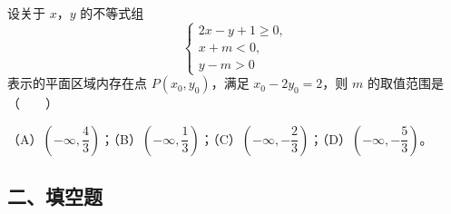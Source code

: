 \begin{question}
设关于 $x$，$y$ 的不等式组
\nopagebreak[4]
\[\begin{cases}2x-y+1\geqslant0,\\ x+m<0,\\ y-m>0\end{cases}\]
表示的平面区域内存在点 $P(x_0,y_0)$，满足 $x_0-2y_0=2$，则 $m$ 的取值范围是\mbox{（　　）}

（A）$\left(-\infty,\dfrac43\right)$；（B）$\left(-\infty,\dfrac13\right)$；（C）$\left(-\infty,-\dfrac23\right)$；（D）$\left(-\infty,-\dfrac53\right)$。

\end{question}
\begingroup
\renewcommand{\gkpart}[1]{\Needspace{0.3\textheight}\subsection*{#1}\nopagebreak}
\gkpart{二、填空题}
\endgroup

